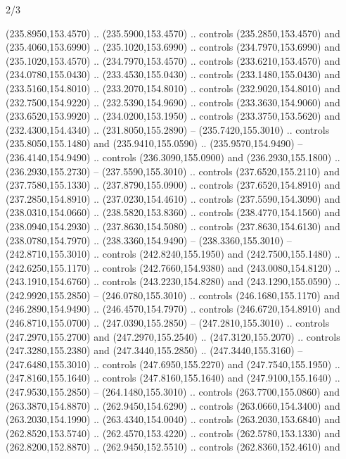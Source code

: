 \begin{flagdescription}{2/3}
\begin{scope}[xshift=0.5\flaglength,yshift=0.5\flagwidth,scale=\flagwidth/259.2]
\begin{scope}[y=0.8pt, x=0.8pt, yscale=-1,shift={(-243,-162)}]
      (235.8950,153.4570) .. (235.5900,153.4570) .. controls (235.2850,153.4570) and
      (235.4060,153.6990) .. (235.1020,153.6990) .. controls (234.7970,153.6990) and
      (235.1020,153.4570) .. (234.7970,153.4570) .. controls (233.6210,153.4570) and
      (234.0780,155.0430) .. (233.4530,155.0430) .. controls (233.1480,155.0430) and
      (233.5160,154.8010) .. (233.2070,154.8010) .. controls (232.9020,154.8010) and
      (232.7500,154.9220) .. (232.5390,154.9690) .. controls (233.3630,154.9060) and
      (233.6520,153.9920) .. (234.0200,153.1950) .. controls (233.3750,153.5620) and
      (232.4300,154.4340) .. (231.8050,155.2890) -- (235.7420,155.3010) .. controls
      (235.8050,155.1480) and (235.9410,155.0590) .. (235.9570,154.9490) --
      (236.4140,154.9490) .. controls (236.3090,155.0900) and (236.2930,155.1800) ..
      (236.2930,155.2730) -- (237.5590,155.3010) .. controls (237.6520,155.2110) and
      (237.7580,155.1330) .. (237.8790,155.0900) .. controls (237.6520,154.8910) and
      (237.2850,154.8910) .. (237.0230,154.4610) .. controls (237.5590,154.3090) and
      (238.0310,154.0660) .. (238.5820,153.8360) .. controls (238.4770,154.1560) and
      (238.0940,154.2930) .. (237.8630,154.5080) .. controls (237.8630,154.6130) and
      (238.0780,154.7970) .. (238.3360,154.9490) -- (238.3360,155.3010) --
      (242.8710,155.3010) .. controls (242.8240,155.1950) and (242.7500,155.1480) ..
      (242.6250,155.1170) .. controls (242.7660,154.9380) and (243.0080,154.8120) ..
      (243.1910,154.6760) .. controls (243.2230,154.8280) and (243.1290,155.0590) ..
      (242.9920,155.2850) -- (246.0780,155.3010) .. controls (246.1680,155.1170) and
      (246.2890,154.9490) .. (246.4570,154.7970) .. controls (246.6720,154.8910) and
      (246.8710,155.0700) .. (247.0390,155.2850) -- (247.2810,155.3010) .. controls
      (247.2970,155.2700) and (247.2970,155.2540) .. (247.3120,155.2070) .. controls
      (247.3280,155.2380) and (247.3440,155.2850) .. (247.3440,155.3160) --
      (247.6480,155.3010) .. controls (247.6950,155.2270) and (247.7540,155.1950) ..
      (247.8160,155.1640) .. controls (247.8160,155.1640) and (247.9100,155.1640) ..
      (247.9530,155.2850) -- (264.1480,155.3010) .. controls (263.7700,155.0860) and
      (263.3870,154.8870) .. (262.9450,154.6290) .. controls (263.0660,154.3400) and
      (263.2030,154.1990) .. (263.4340,154.0040) .. controls (263.2030,153.6840) and
      (262.8520,153.5740) .. (262.4570,153.4220) .. controls (262.5780,153.1330) and
      (262.8200,152.8870) .. (262.9450,152.5510) .. controls (262.8360,152.4610) and

\end{scope}
\end{scope}
\end{flagdescription}
